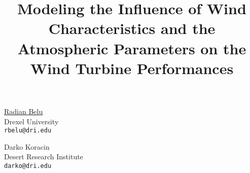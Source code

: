 \title{Modeling the Influence of Wind Characteristics and the Atmospheric Parameters on the Wind Turbine Performances}
\author{} \institute{}
\maketitle

\begin{center}
{\large \underline{Radian Belu}}\\
Drexel University\\
{\tt rbelu@dri.edu}\\
\vspace{4mm}

{\large Darko Koracin}\\
Desert Research Institute\\
{\tt darko@dri.edu}
\end{center}

